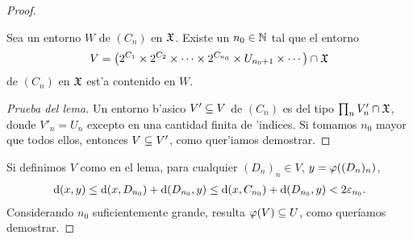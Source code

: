 \begin{proof}
  \begin{lemma}
      Sea un entorno $W $ de $(C_n)$ en $\mathfrak{X}$. Existe un $n_0\in \mathbb{N}$ tal que el entorno
      \begin{gather*}
          V = \left(2^{C_1}\times 2^{C_2}\times \cdots\times 2^{C_{n_0}}\times U_{n_0+1}\times\cdots \right)\cap \mathfrak{X}
      \end{gather*}
      de $(C_n)$ en $\mathfrak{X} $ est'a contenido en $W $.
  \end{lemma}
  \begin{proof}[Prueba del lema]
      Un entorno b'asico $V'\subseteq V$ de $(C_n)$ es del tipo $\prod_n V'_n\cap \mathfrak{X} $, donde $V'_n = U_n$ excepto en una cantidad finita de 'indices. Si tomamos $n_0$ mayor que todos ellos, entonces $V\subseteq V'$, como quer'iamos demostrar.
  \end{proof}
  Si definimos $V$ como en el lema, para cualquier $ (D_n)_n\in V  $, $ y = \varphi((D_n )_n) $,
  \begin{gather*}\label{eqcont1}
    \dd (x,y) \leq \dd (x,D_{n_0})+\dd(D_{n_0},y)\leq \dd(x,C_{n_0})+\dd (D_{n_0},y) <2\varepsilon_{n_0}.
  \end{gather*}
  Considerando $ n_0  $ suficientemente grande, resulta $ \varphi(V)\subseteq U  $, como queríamos demostrar.


\end{proof}
